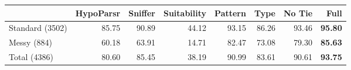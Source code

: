 \begin{tabular}{lrrr|rrrr}
 & HypoParsr & Sniffer & Suitability & Pattern & Type & No Tie & Full\\
\hline
Standard (3502) & 85.75 & 90.89 & 44.12 & 93.15 & 86.26 & 93.46 & \textbf{95.80}\\
Messy (884) & 60.18 & 63.91 & 14.71 & 82.47 & 73.08 & 79.30 & \textbf{85.63}\\
Total (4386) & 80.60 & 85.45 & 38.19 & 90.99 & 83.61 & 90.61 & \textbf{93.75}\\
\hline
\end{tabular}